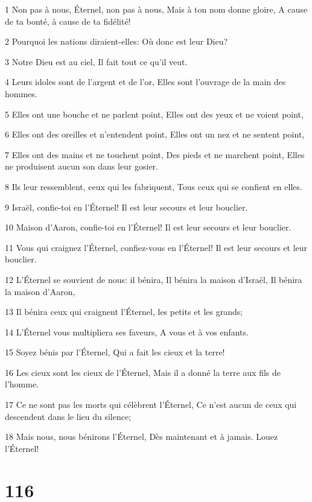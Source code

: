 \par 1 Non pas à nous, Éternel, non pas à nous, Mais à ton nom donne gloire, A cause de ta bonté, à cause de ta fidélité!
\par 2 Pourquoi les nations diraient-elles: Où donc est leur Dieu?
\par 3 Notre Dieu est au ciel, Il fait tout ce qu'il veut.
\par 4 Leurs idoles sont de l'argent et de l'or, Elles sont l'ouvrage de la main des hommes.
\par 5 Elles ont une bouche et ne parlent point, Elles ont des yeux et ne voient point,
\par 6 Elles ont des oreilles et n'entendent point, Elles ont un nez et ne sentent point,
\par 7 Elles ont des mains et ne touchent point, Des pieds et ne marchent point, Elles ne produisent aucun son dans leur gosier.
\par 8 Ils leur ressemblent, ceux qui les fabriquent, Tous ceux qui se confient en elles.
\par 9 Israël, confie-toi en l'Éternel! Il est leur secours et leur bouclier.
\par 10 Maison d'Aaron, confie-toi en l'Éternel! Il est leur secours et leur bouclier.
\par 11 Vous qui craignez l'Éternel, confiez-vous en l'Éternel! Il est leur secours et leur bouclier.
\par 12 L'Éternel se souvient de nous: il bénira, Il bénira la maison d'Israël, Il bénira la maison d'Aaron,
\par 13 Il bénira ceux qui craignent l'Éternel, les petits et les grands;
\par 14 L'Éternel vous multipliera ses faveurs, A vous et à vos enfants.
\par 15 Soyez bénis par l'Éternel, Qui a fait les cieux et la terre!
\par 16 Les cieux sont les cieux de l'Éternel, Mais il a donné la terre aux fils de l'homme.
\par 17 Ce ne sont pas les morts qui célèbrent l'Éternel, Ce n'est aucun de ceux qui descendent dans le lieu du silence;
\par 18 Mais nous, nous bénirons l'Éternel, Dès maintenant et à jamais. Louez l'Éternel!

\chapter{116}


